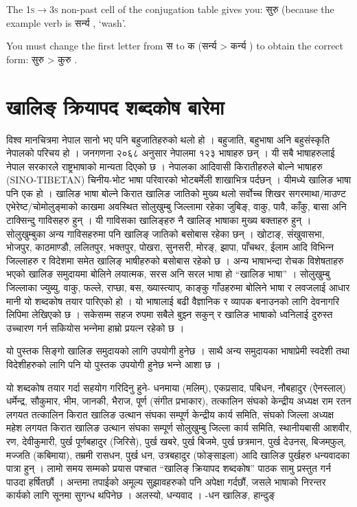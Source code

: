 The \textsc{1s$\rightarrow$3s} non-past cell of the conjugation table gives you: सुरु  (because the example verb is सर्न्य , `wash'.

You must change the first letter from स  to क  (सर्न्य  > कर्न्य ) to obtain the correct form: सुरु  > कुरु .

\section{खालिङ् क्रियापद शब्दकोष बारेमा}
विश्व मानचित्रमा नेपाल सानो भए पनि बहुजातिहरुको थलो हो । बहुजाति, बहुभाषा अनि बहुसंस्कृति नेपालको परिचय हो । जनगणना २०६८ अनुसार नेपालमा १२३ भाषाहरु छन् । यी सबै भाषाहरुलाई नेपाल सरकारले राष्ट्रभाषाको मान्यता दिएको छ । नेपालका आदिवासी किरातीहरुले बोल्‍ने भाषाहरु (SINO-TIBETAN) चिनीय-भोट भाषा परिवारको भोटबर्मेली शाखाभित्र पर्दछन् । यीमध्ये खालिङ भाषा पनि एक हो । खालिङ भाषा बोल्‍ने किरात खालिङ जातिको मुख्य थलो सर्वोच्‍च शिखर सगरमाथा/माउण्ट एभेरेष्ट/चोमोलुङ्‍माको  काखमा अवस्थित सोलुखुम्बु जिल्‍लामा रहेका जुबिङ्, वाकु, पावै, काँकु, बासा अनि टाक्सिन्दु गा‍‍विसहरु हुन् । यी गाविसका खालिङ्‍हरु नै खालिङ् भाषाका मुख्य बक्ताहरु हुन् । सोलुखुम्बुका अन्य गाविसहरुमा पनि खालिङ् जातिको बसोबास रहेका छन् । खोटाङ्, संखुवासभा, भोजपुर, काठमाण्डौ, ललितपुर, भक्तपुर, पोखरा, सुनसरी, मोरङ्, झापा, पाँचथर, ईलाम आदि विभिन्‍न जिल्‍लाहरु र विदेशमा समेत खालिङ् भाषीहरुको बसोबास रहेको छ । 
अन्य भाषाभन्दा रोचक विशेषताहरु भएको खालिङ समुदायमा बोलिने लयात्मक, सरस अनि सरल भाषा हो “खालिङ भाषा” । सोलुखुम्बु जिल्‍लाका ज्युब्यु, वाकु, फल्‍ले, राप्छा, बस, ख्यास्त्याप्, काङ्‍कु गाँउहरुमा बोलिने भाषा र लवजलाई आधार मानी यो शब्दकोष तयार पारिएको हो । यो भाषालाई बढी वैज्ञानिक र व्यापक बनाउनको लागि देवनागरि लिपिमा लेखिएको छ । सकेसम्म सहज रुपमा सबैले बुझ्‍न सकुन् र खालिङ भाषाको ध्वनिलाई दुरुस्त उच्‍चारण गर्न सकियोस भन्‍नेमा हाम्रो प्रयत्‍न रहेको छ । 

यो पुस्तक सिङ्‍गो खालिङ समुदायको लागि उपयोगी हुनेछ । साथै अन्य समुदायका भाषाप्रेमी स्वदेशी तथा विदेशीहरुको लागि पनि यो पुस्तक उपयोगी हुनेछ भन्‍ने आशा छ । 

यो शब्दकोष तयार गर्दा सहयोग गरिदिनु हुने- धनमाया (मलिम्), एकप्रसाद, पबिधन, नौबहादुर (ऐनस्लाल्) धर्मेन्द्र, सौकुमार, भीम, जानकी, भैराज, पूर्ण (संगीत प्रभाकार), तत्कालिन संघको केन्द्रीय अध्यक्ष राम रतन लगयत तत्कालिन किरात खालिङ उत्थान संघका सम्पूर्ण केन्द्रीय कार्य समिति, संघको जिल्‍ला अध्यक्ष महेश लगयत किरात खालिङ उत्थान संघका सम्पूर्ण सोलुखुम्बु जिल्‍ला कार्य समिति, स्थानीयबासी आशवीर, रण, देवीकुमारी, पुर्ख पूर्णबहादुर (जिरिसे), पुर्ख खबरे, पुर्ख बिजमे, पुर्ख छत्रमान, पुर्ख देउनस्, बिजम्‌फुल्, मज्जति (कबिमाया), तम्रमी रासधन, पुर्ख धन, उत्रबहादुर (फोङ्‍साइला) आदि खालिङ पुर्खहरु धन्यवादका पात्रा हुन् ।
लामो समय सम्मको प्रयास पश्चात “खालिङ् क्रियापद शब्दकोष” पाठक सामु प्रस्तुत गर्न पाउदा हर्षितछौं । अन्तमा तपाईको अमूल्य सुझावहरुको पनि अपेक्षा गर्दछौं, जसले भाषाको निरन्तर कार्यको लागि सूनमा सुगन्ध थपिनेछ ।
अलस्यो, धन्यवाद ।
-धन खालिङ, हान्दुङ् 





